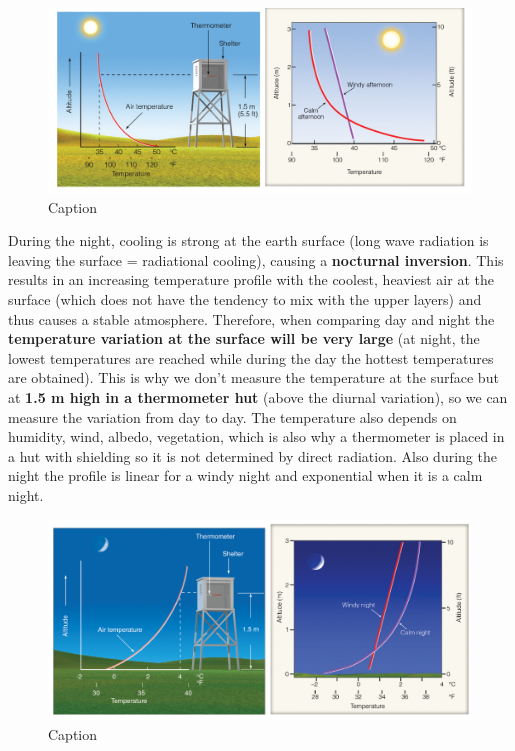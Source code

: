 \documentclass[12pt,oneside]{book}
\begin{document}
\begin{figure}

{\centering \includegraphics[width=1\linewidth]{figures/Figure213} 

}

\caption{Caption}\label{fig:TempProfile}
\end{figure}

During the night, cooling is strong at the earth surface (long wave
radiation is leaving the surface = radiational cooling), causing a
\textbf{nocturnal inversion}. This results in an increasing temperature
profile with the coolest, heaviest air at the surface (which does not
have the tendency to mix with the upper layers) and thus causes a stable
atmosphere. Therefore, when comparing day and night the
\textbf{temperature variation at the surface will be very large} (at
night, the lowest temperatures are reached while during the day the
hottest temperatures are obtained). This is why we don't measure the
temperature at the surface but at \textbf{1.5 m high in a thermometer
hut} (above the diurnal variation), so we can measure the variation from
day to day. The temperature also depends on humidity, wind, albedo,
vegetation, which is also why a thermometer is placed in a hut with
shielding so it is not determined by direct radiation. Also during the
night the profile is linear for a windy night and exponential when it is
a calm night.

\begin{figure}

{\centering \includegraphics[width=0.5\linewidth]{figures/Figure214} 

}

\caption{Caption}\label{fig:TempProfile2}
\end{figure}
\end{document}
